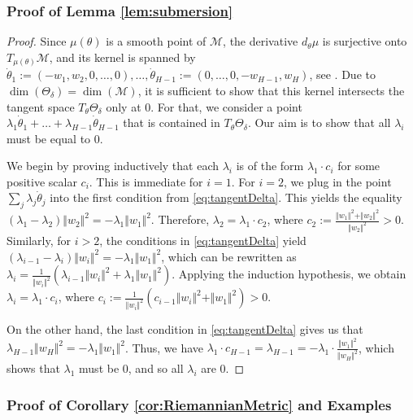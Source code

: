 \documentclass[twoside]{article}
\theoremstyle{definition}
\theoremstyle{remark}
\begin{document}
\subsubsection{Proof of Lemma \ref{lem:submersion}}
\begin{proof}
	Since $\mu(\theta)$ is a smooth point of $\mathcal{M}$,  the derivative $d_\theta \mu$ is surjective onto $T_{\mu(\theta)} \mathcal{M}$, and its kernel is spanned by $\dot \theta_1 := (-w_1,w_2,0,\ldots,0), \ldots, \dot \theta_{H-1} := (0,\ldots,0,-w_{H-1},w_H)$, see \cite{kohn2024function}.
	Due to $\dim(\Theta_\delta) = \dim(\mathcal{M})$, it is sufficient to show that this kernel intersects the tangent space $T_\theta \Theta_\delta$ only at $0$. 
	For that, we consider a point $\lambda_1 \dot \theta_1 + \ldots + \lambda_{H-1} \dot \theta_{H-1}$ that is contained in $T_\theta \Theta_\delta$.
	Our aim is to show that all $\lambda_i$ must be equal to $0$.
	
	We begin by proving inductively that each $\lambda_i$ is of the form $\lambda_1 \cdot c_i$ for some positive scalar $c_i$.
	This is immediate for $i=1$. 
	For $i=2$, we plug in the point $\sum_j \lambda_j \dot \theta_j$ into the first condition from \eqref{eq:tangentDelta}.
	This yields the equality $(\lambda_1 - \lambda_2) \Vert w_2 \Vert^2 = -\lambda_1 \Vert w_1 \Vert^2 $.
	Therefore, $\lambda_2 = \lambda_1 \cdot c_2$, where $c_2 := \frac{\Vert w_1 \Vert^2 + \Vert w_2 \Vert^2}{\Vert w_2 \Vert^2}>0$.
	Similarly, for $i>2$, the conditions in \eqref{eq:tangentDelta} yield
	$(\lambda_{i-1}-\lambda_i) \Vert w_i \Vert^2 = - \lambda_1 \Vert w_1 \Vert^2$, which can be rewritten as 
	$\lambda_i = \frac{1}{\Vert w_i \Vert^2} (\lambda_{i-1} \Vert w_i \Vert^2 + \lambda_1 \Vert w_1 \Vert^2)$.
	Applying the induction hypothesis, we obtain
	$\lambda_i = \lambda_1 \cdot c_i$, where
	$c_i := \frac{1}{\Vert w_i \Vert^2} (c_{i-1} \Vert w_i \Vert^2 + \Vert w_1 \Vert^2)>0$.
	
	On the other hand, the last condition in \eqref{eq:tangentDelta} gives us that $\lambda_{H-1} \Vert w_H \Vert^2 = - \lambda_1 \Vert w_1 \Vert^2$.
	Thus, we have $\lambda_1 \cdot c_{H-1} = \lambda_{H-1} = - \lambda_1 \cdot \frac{\Vert w_1 \Vert^2}{\Vert w_H \Vert^2}$, which shows that $\lambda_1$ must be $0$, and so all $\lambda_i$ are $0$.
\end{proof}



\subsubsection{Proof of Corollary \ref{cor:RiemannianMetric} and Examples}
\end{document}
